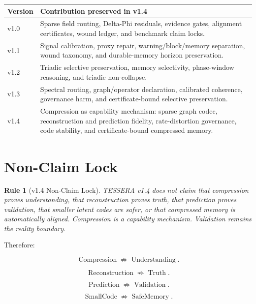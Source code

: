 \documentclass[12pt]{article}
\newtheorem{rulebox}{Rule}
\begin{document}
\begin{longtable}{p{}p{}}
\toprule
\textbf{Version} & \textbf{Contribution preserved in v1.4} \\
\midrule
v1.0 & Sparse field routing, Delta-Phi residuals, evidence gates,
alignment certificates, wound ledger, and benchmark claim locks. \\
v1.1 & Signal calibration, proxy repair, warning/block/memory separation,
wound taxonomy, and durable-memory horizon preservation. \\
v1.2 & Triadic selective preservation, memory selectivity, phase-window
reasoning, and triadic non-collapse. \\
v1.3 & Spectral routing, graph/operator declaration, calibrated coherence,
governance harm, and certificate-bound selective preservation. \\
v1.4 & Compression as capability mechanism: sparse graph codec, reconstruction
and prediction fidelity, rate-distortion governance, code stability, and
certificate-bound compressed memory. \\
\bottomrule
\end{longtable}

\section{Non-Claim Lock}

\begin{rulebox}[v1.4 Non-Claim Lock]
TESSERA v1.4 does not claim that compression proves understanding, that
reconstruction proves truth, that prediction proves validation, that smaller
latent codes are safer, or that compressed memory is automatically aligned.
Compression is a capability mechanism. Validation remains the reality boundary.
\end{rulebox}

Therefore:

\[
\operatorname{Compression}\not\Rightarrow\operatorname{Understanding}.
\]

\[
\operatorname{Reconstruction}\not\Rightarrow\operatorname{Truth}.
\]

\[
\operatorname{Prediction}\not\Rightarrow\operatorname{Validation}.
\]

\[
\operatorname{SmallCode}\not\Rightarrow\operatorname{SafeMemory}.
\]
\end{document}
